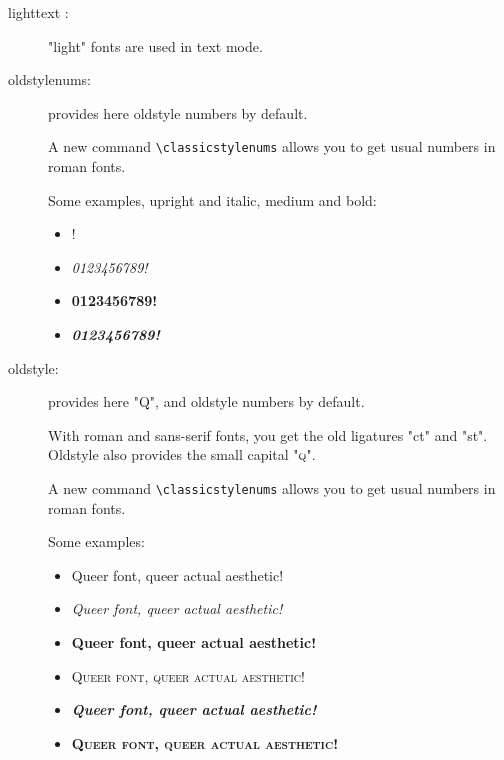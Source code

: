\documentclass[a4paper,11pt]{christophe}
\begin{document}
\begin{description}

	\item[lighttext :] "light" fonts are used in text mode.

	\item[oldstylenums:] provides here
		oldstyle numbers by default. 
		
		A new command \verb=\classicstylenums= allows you to get usual numbers in roman fonts.
		
		Some examples, upright and italic, medium and bold:
		
			\begin{itemize}
				\item {!}
				\item {\selectfont \textit{0123456789!}}
				\item {\selectfont \textbf{0123456789!}}
				\item {\selectfont \textbf{\textit{0123456789!}}}
			\end{itemize}

	\item[oldstyle:] provides here {\selectfont "Q"}, 
		and oldstyle numbers by default. 
		
		With roman and sans-serif fonts, you get the old ligatures {\selectfont "ct"} 
		and {\selectfont "st"}.
		Oldstyle also provides the small capital  {\selectfont "\textsc{q}"}.
		
		A new command \verb=\classicstylenums= allows you to get usual numbers in roman fonts.
		
		Some examples:
		
			\begin{itemize}
				\item {\selectfont Queer font, queer actual aesthetic!}
				\item {\selectfont \textit{Queer font, queer actual aesthetic!}}
				\item {\selectfont \textbf{Queer font, queer actual aesthetic!}}
				\item {\selectfont \textsc{Queer font, queer actual aesthetic!}}
				\item {\selectfont \textbf{\textit{Queer font, queer actual aesthetic!}}}
				\item {\selectfont \textsc{\textbf{Queer font, queer actual aesthetic!}}}
			\end{itemize}
			

\end{description}
\end{document}
